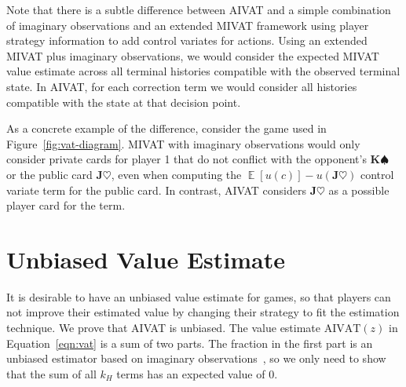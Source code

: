 \documentclass[letterpaper]{article}
\def\VAT{AIVAT}
\begin{document}
Note that there is a subtle difference between \VAT{} and a simple
combination of imaginary observations and an extended MIVAT framework
using player strategy information to add control variates for
actions. Using an extended MIVAT plus imaginary observations, we would
consider the expected MIVAT value estimate across all terminal
histories compatible with the observed terminal state. In \VAT{}, for
each correction term we would consider all histories compatible with
the state at that decision point.

As a concrete example of the difference, consider the game used in
Figure~\ref{fig:vat-diagram}. MIVAT with imaginary observations would
only consider private cards for player 1 that do not conflict with the
opponent's \textbf{K$\spadesuit$} or the public
card \textbf{J$\heartsuit$}, even when computing the
$\mathop{\mathbb{E}}[u(c)]-u(\textbf{J$\heartsuit$})$ control variate
term for the public card. In contrast, \VAT{}
considers \textbf{J$\heartsuit$} as a possible player card for the
term.


\section{Unbiased Value Estimate}
It is desirable to have an unbiased value estimate for games, so that
players can not improve their estimated value by changing their
strategy to fit the estimation technique. We prove that \VAT{} is
unbiased. The value estimate $\text{AIVAT}(z)$ in
Equation~\ref{eqn:vat} is a sum of two parts. The fraction in the
first part is an unbiased estimator based on imaginary
observations~\cite{08icml-ispoker}, so we only need to show that the
sum of all $k_H$ terms has an expected value of $0$.
\end{document}
